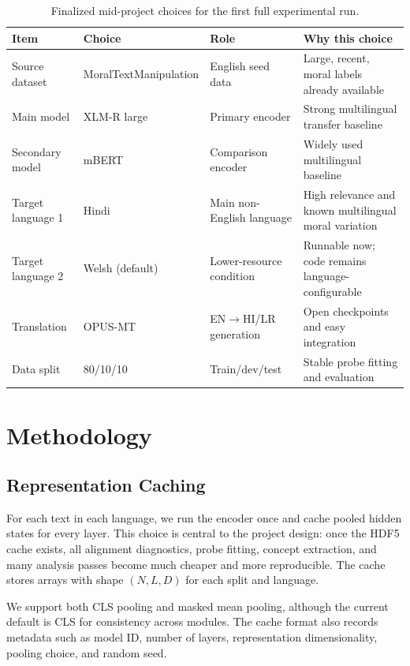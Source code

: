 \documentclass[11pt]{article}
\begin{document}
\begin{table}[t]
\centering
\small
\begin{tabular}{p{}p{}p{}p{}}
\toprule
\textbf{Item} & \textbf{Choice} & \textbf{Role} & \textbf{Why this choice} \\
\midrule
Source dataset & MoralTextManipulation & English seed data & Large, recent, moral labels already available \\
Main model & XLM-R large & Primary encoder & Strong multilingual transfer baseline \\
Secondary model & mBERT & Comparison encoder & Widely used multilingual baseline \\
Target language 1 & Hindi & Main non-English language & High relevance and known multilingual moral variation \\
Target language 2 & Welsh (default) & Lower-resource condition & Runnable now; code remains language-configurable \\
Translation & OPUS-MT & EN$\rightarrow$HI/LR generation & Open checkpoints and easy integration \\
Data split & 80/10/10 & Train/dev/test & Stable probe fitting and evaluation \\
\bottomrule
\end{tabular}
\caption{Finalized mid-project choices for the first full experimental run.}
\label{tab:choices}
\end{table}

\section{Methodology}
\subsection{Representation Caching}
For each text in each language, we run the encoder once and cache pooled hidden states for every layer. This choice is central to the project design: once the HDF5 cache exists, all alignment diagnostics, probe fitting, concept extraction, and many analysis passes become much cheaper and more reproducible. The cache stores arrays with shape $(N, L, D)$ for each split and language.

We support both \textsc{CLS} pooling and masked mean pooling, although the current default is \textsc{CLS} for consistency across modules. The cache format also records metadata such as model ID, number of layers, representation dimensionality, pooling choice, and random seed.
\end{document}
